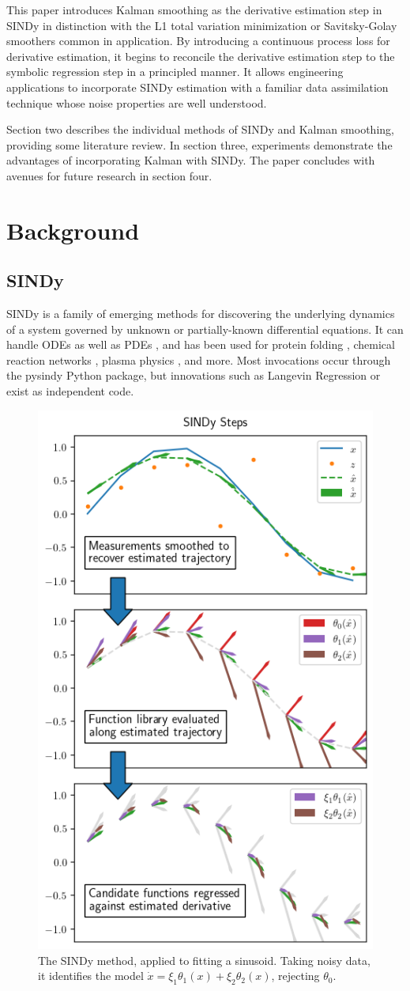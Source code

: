 \documentclass{article}
\begin{document}
This paper introduces Kalman smoothing as the derivative estimation step in SINDy in distinction with the L1 total variation minimization or Savitsky-Golay smoothers common in application.
By introducing a continuous process loss for derivative estimation, it begins to reconcile the derivative estimation step to the symbolic regression step in a principled manner.
It allows engineering applications to incorporate SINDy estimation with a familiar data assimilation technique whose noise properties are well understood.

Section two describes the individual methods of SINDy and Kalman smoothing, providing some literature review.  In section three, experiments demonstrate the advantages of incorporating Kalman with SINDy.  The paper concludes with avenues for future research in section four.

\section{Background}

\subsection{SINDy}
SINDy \cite{Brunton2016} is a family of emerging methods for discovering the underlying dynamics of a system governed by unknown or partially-known \cite{Champion2020} differential equations.  It can handle ODEs as well as PDEs \cite{Rudy2017}, and has been used for protein folding \cite{Boninsegna2018}, chemical reaction networks \cite{Hoffmann2019}, plasma physics \cite{Guan2021}, and more.  Most invocations occur through the pysindy Python package, but innovations such as Langevin Regression \cite{Callaham2021} or \cite{Rudy2019} exist as independent code.

\begin{figure}[ht]
    \label{fig:sindy}
    \centering
    \includegraphics[width=.5\textwidth]{images/explain_sindy}
    \caption{The SINDy method, applied to fitting a sinusoid.  Taking noisy data, it identifies the model $\dot x = \xi_1\theta_1(x) + \xi_2\theta_2(x)$, rejecting $\theta_0$.}
\end{figure}
\end{document}
